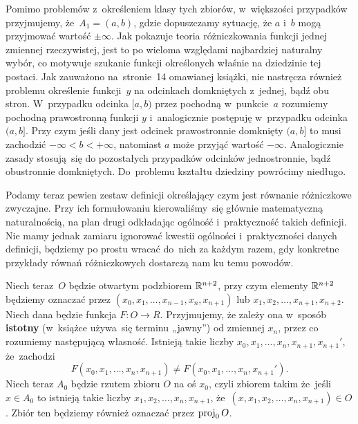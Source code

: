 \documentclass[a4paper,11pt]{article}
\numberwithin{equation}{section}
\begin{document}
Pomimo problemów z~określeniem klasy tych zbiorów, w~większości przypadków
przyjmujemy, że~$A_{ 1 } = ( a, b )$, gdzie dopuszczamy sytuację, że $a$
i~$b$ mogą przyjmować wartość $\pm \infty$. Jak pokazuje teoria różniczkowania
funkcji jednej zmiennej rzeczywistej, jest to po wieloma względami
najbardziej naturalny wybór, co motywuje szukanie funkcji określonych
właśnie na dziedzinie tej postaci. Jak zauważono na~stronie~14 omawianej
książki, nie nastręcza również problemu określenie funkcji~$y$ na odcinkach
domkniętych z~jednej, bądź obu stron. W~przypadku odcinka $[ a, b )$ przez
pochodną w~punkcie~$a$ rozumiemy pochodną prawostronną funkcji $y$
i~analogicznie
postępuję w~przypadku odcinka $( a, b ]$. Przy czym jeśli dany jest odcinek
prawostronnie domknięty $( a, b ]$ to musi zachodzić $-\infty < b < +\infty$,
natomiast $a$ może przyjąć wartość $-\infty$. Analogicznie zasady stosują~się do
pozostałych przypadków odcinków jednostronnie, bądź obustronnie
domkniętych. Do~problemu kształtu dziedziny powrócimy niedługo.

Podamy teraz pewien zestaw definicji określający czym jest równanie
różniczkowe zwyczajne. Przy ich formułowaniu kierowaliśmy~się głównie
matematyczną naturalnością, na plan drugi odkładając ogólność i~praktyczność
takich definicji. Nie mamy jednak zamiaru ignorować kwestii ogólności
i~praktyczności danych definicji, będziemy po prostu wracać do~nich
za każdym razem, gdy konkretne przykłady równań różniczkowych dostarczą nam
ku temu powodów.

Niech teraz~$O$ będzie otwartym podzbiorem $\mathbb{R}^{ n + 2 }$, przy czym
elementy $\mathbb{R}^{ n + 2 }$ będziemy oznaczać przez
$( x_{ 0 }, x_{ 1 }, \ldots, x_{ n - 1 }, x_{ n }, x_{ n + 1 } )$
lub $x_{ 1 }, x_{ 2 }, \ldots, x_{ n + 1 }, x_{ n + 2 }$. Niech dana będzie funkcja
$F : O \to R$. Przyjmujemy, że zależy ona w~sposób \textbf{istotny}
(w~książce używa~się terminu „jawny”) od zmiennej $x_{ n }$, przez co
rozumiemy następującą własność. Istnieją takie liczby
$x_{ 0 }, x_{ 1 }, \ldots, x_{ n }, x_{ n + 1 }, x_{ n + 1 }'$, że~zachodzi
\begin{equation}
  \label{eq:Czym-jest-rownanie-ETC-02}
  F( x_{ 0 }, x_{ 1 }, \ldots, x_{ n }, x_{ n + 1 } ) \neq
  F( x_{ 0 }, x_{ 1 }, \ldots, x_{ n }, x_{ n + 1 }' ).
\end{equation}
Niech teraz $A_{ 0 }$ będzie rzutem zbioru $O$ na oś $x_{ 0 }$, czyli zbiorem
takim że~jeśli $x \in A_{ 0 }$ to istnieją takie liczby
$x_{ 1 }, x_{ 2 }, \ldots, x_{ n }, x_{ n + 1 }$,
że~$( x, x_{ 1 }, x_{ 2 }, \ldots, x_{ n }, x_{ n + 1 } ) \in O$. Zbiór ten
będziemy również oznaczać przez $\operatorname{proj}_{ 0 } O$.
\end{document}
